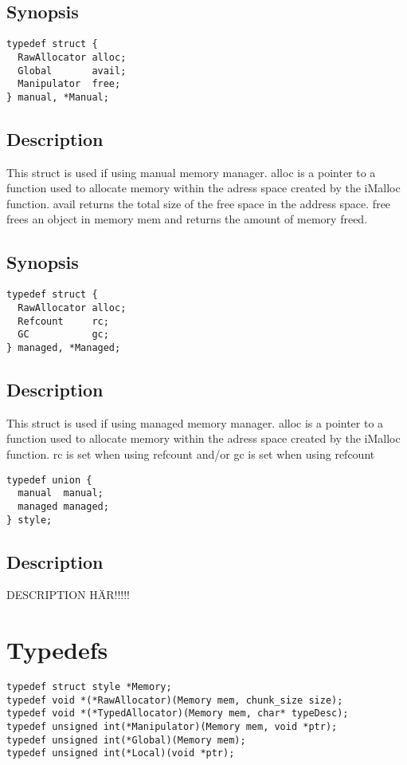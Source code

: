 \documentclass{article}
\begin{document}
\subsection*{Synopsis}
\begin{verbatim}
typedef struct {
  RawAllocator alloc;
  Global       avail;
  Manipulator  free;
} manual, *Manual; 
\end{verbatim}
\subsection*{Description}
This struct is used if using manual memory manager.
alloc is a pointer to a function used to allocate memory within the adress space created by the iMalloc function.
avail returns the total size of the free space in the address space.
free frees an object in memory mem and returns the amount of memory freed.


\subsection*{Synopsis}
\begin{verbatim}
typedef struct {
  RawAllocator alloc;
  Refcount     rc;
  GC           gc;
} managed, *Managed;
\end{verbatim}
\subsection*{Description}
This struct is used if using managed memory manager.
alloc is a pointer to a function used to allocate memory within the adress space created by the iMalloc function.
rc is set when using refcount and/or gc is set when using refcount

\begin{verbatim}
typedef union {
  manual  manual;
  managed managed;
} style;
\end{verbatim}
\subsection*{Description}
DESCRIPTION HÄR!!!!!


\section{Typedefs} 
\begin{verbatim}
typedef struct style *Memory;
typedef void *(*RawAllocator)(Memory mem, chunk_size size);
typedef void *(*TypedAllocator)(Memory mem, char* typeDesc);
typedef unsigned int(*Manipulator)(Memory mem, void *ptr);
typedef unsigned int(*Global)(Memory mem);
typedef unsigned int(*Local)(void *ptr);
\end{verbatim}
\end{document}
